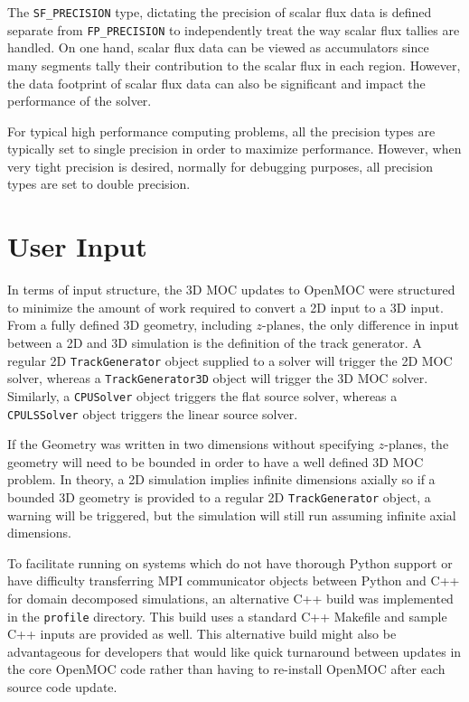 The \texttt{SF_PRECISION} type, dictating the precision of scalar flux data is defined separate from \texttt{FP_PRECISION} to independently treat the way scalar flux tallies are handled. On one hand, scalar flux data can be viewed as accumulators since many segments tally their contribution to the scalar flux in each region. However, the data footprint of scalar flux data can also be significant and impact the performance of the solver.

For typical high performance computing problems, all the precision types are typically set to single precision in order to maximize performance. However, when very tight precision is desired, normally for debugging purposes, all precision types are set to double precision.


\section{User Input}
\label{sec:user-input}

In terms of input structure, the 3D MOC updates to OpenMOC were structured to minimize the amount of work required to convert a 2D input to a 3D input. From a fully defined 3D geometry, including $z$-planes, the only difference in input between a 2D and 3D simulation is the definition of the track generator. A regular 2D \texttt{TrackGenerator} object supplied to a solver will trigger the 2D \ac{MOC} solver, whereas a \texttt{TrackGenerator3D} object will trigger the 3D \ac{MOC} solver. Similarly, a \texttt{CPUSolver} object triggers the flat source solver, whereas a \texttt{CPULSSolver} object triggers the linear source solver.

If the Geometry was written in two dimensions without specifying $z$-planes, the geometry will need to be bounded in order to have a well defined 3D \ac{MOC} problem. In theory, a 2D simulation implies infinite dimensions axially so if a bounded 3D geometry is provided to a regular 2D \texttt{TrackGenerator} object, a warning will be triggered, but the simulation will still run assuming infinite axial dimensions.

To facilitate running on systems which do not have thorough Python support or have difficulty transferring MPI communicator objects between Python and C++ for domain decomposed simulations, an alternative C++ build was implemented in the \texttt{profile} directory. This build uses a standard C++ Makefile and sample C++ inputs are provided as well. This alternative build might also be advantageous for developers that would like quick turnaround between updates in the core OpenMOC code rather than having to re-install OpenMOC after each source code update. 

